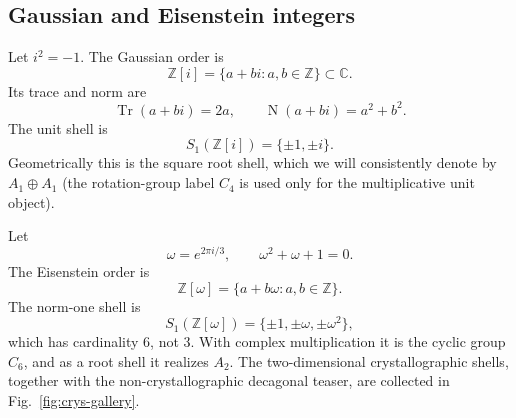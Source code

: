\documentclass[12pt,oneside,english]{amsart}
\numberwithin{equation}{section}
\numberwithin{figure}{section}
\numberwithin{table}{section}
\theoremstyle{plain}
\theoremstyle{definition}
\theoremstyle{remark}
\newcommand{\ZZ}{\mathbb Z}
\newcommand{\CC}{\mathbb C}
\newcommand{\Tr}{\operatorname{Tr}}
\newcommand{\Norm}{\operatorname{N}}
\begin{document}
\subsection{Gaussian and Eisenstein integers}

Let \(i^2=-1\). The Gaussian order is
\begin{equation}
\ZZ[i]=\{a+bi:a,b\in\ZZ\}\subset\CC.
\label{eq:gaussian-order}
\end{equation}
Its trace and norm are
\begin{equation}
\Tr(a+bi)=2a,\qquad \Norm(a+bi)=a^2+b^2.
\label{eq:gaussian-trace-norm}
\end{equation}
The unit shell is
\begin{equation}
S_1(\ZZ[i])=\{\pm1,\pm i\}.
\label{eq:gaussian-units}
\end{equation}
Geometrically this is the square root shell, which we will consistently denote by \(A_1\oplus A_1\) (the rotation-group label \(C_4\) is used only for the multiplicative unit object).

Let
\begin{equation}
\omega=e^{2\pi i/3},\qquad \omega^2+\omega+1=0.
\label{eq:eisenstein-omega}
\end{equation}
The Eisenstein order is
\begin{equation}
\ZZ[\omega]=\{a+b\omega:a,b\in\ZZ\}.
\label{eq:eisenstein-order}
\end{equation}
The norm-one shell is
\begin{equation}
S_1(\ZZ[\omega])=\{\pm1,\pm\omega,\pm\omega^2\},
\label{eq:eisenstein-units}
\end{equation}
which has cardinality \(6\), not \(3\). With complex multiplication it is the cyclic group \(C_6\), and as a root shell it realizes \(A_2\). The two-dimensional crystallographic shells, together with the non-crystallographic decagonal teaser, are collected in Fig.~\ref{fig:crys-gallery}.
\end{document}
